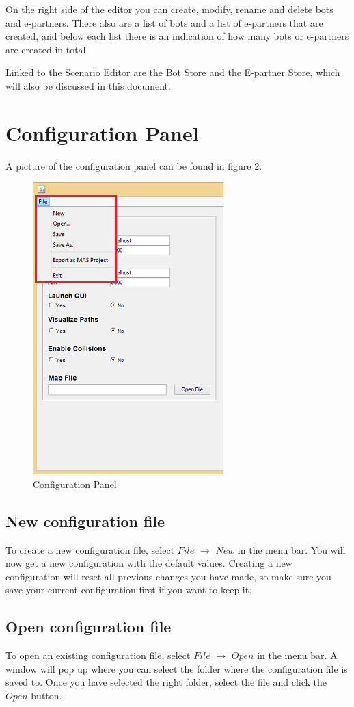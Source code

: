 \documentclass[a4paper]{article}
\begin{document}
On the right side of the editor you can create, modify, rename and delete bots and e-partners. There also are a list of bots and a list of e-partners that are created, and below each list there is an indication of how many bots or e-partners are created in total.

Linked to the Scenario Editor are the Bot Store and the E-partner Store, which will also be discussed in this document.
\pagebreak
\section{Configuration Panel}
A picture of the configuration panel can be found in figure 2.
\begin{figure}[h]
\begin{center}
\includegraphics{config.png}
\end{center}
\caption{Configuration Panel}
\end{figure}
\subsection{New configuration file}
To create a new configuration file, select $File$ $\to$ $New$ in the menu bar. You will now get a new configuration with the default values. Creating a new configuration will reset all previous changes you have made, so make sure you save your current configuration first if you want to keep it.

\subsection{Open configuration file}
To open an existing configuration file, select $File$ $\to$ $Open$ in the menu bar. A window will pop up where you can select the folder where the configuration file is saved to. Once you have selected the right folder, select the file and click the $Open$ button.
\end{document}
